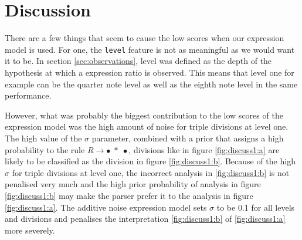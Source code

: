 \chapter{Discussion}
\label{sec:discussion}


There are a few things that seem to cause the low scores when our expression model is used. For one, the \texttt{level} feature is not as meaningful as we would want it to be. In section \ref{sec:observations}, level was defined as the depth of the hypothesis at which a expression ratio is observed. This means that level one for example can be the quarter note level as well as the eighth note level in the same performance. 

However, what was probably the biggest contribution to the low scores of the expression model was the high amount of noise for triple divisions at level one. The high value of the $\sigma$ parameter, combined with a prior that assigns a high probability to the rule $R \rightarrow \bullet\; *\; \bullet$, divisions like in figure \ref{fig:discuss1:a} are likely to be classified as the division in figure \ref{fig:discuss1:b}. Because of the high $\sigma$ for triple divisions at level one, the incorrect analysis in \ref{fig:discuss1:b} is not penalised very much and the high prior probability of analysis in figure \ref{fig:discuss1:b} may make the parser prefer it to the analysis in figure \ref{fig:discuss1:a}. The additive noise expression model sets $\sigma$ to be 0.1 for all levels and divisions and penalises the interpretation \ref{fig:discuss1:b} of \ref{fig:discuss1:a} more severely.

